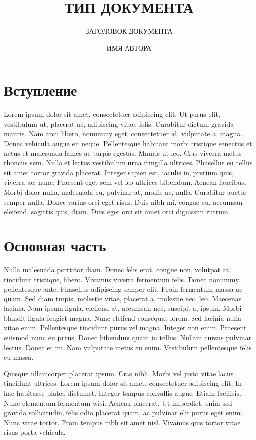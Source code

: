 \documentclass{itmo-report}
\title{ТИП ДОКУМЕНТА}
\subtitle{ЗАГОЛОВОК ДОКУМЕНТА}
\author{ИМЯ АВТОРА}
\begin{document}
\maketitle
\tableofcontents
\newpage


\section{Вступление}
Lorem ipsum dolor sit amet, consectetuer adipiscing elit. Ut purus elit, vestibulum ut, placerat ac, adipiscing vitae, felis. Curabitur dictum gravida mauris. Nam arcu libero, nonummy eget, consectetuer id, vulputate a, magna. Donec vehicula augue eu neque. Pellentesque habitant morbi tristique senectus et netus et malesuada fames ac turpis egestas. Mauris ut leo. Cras viverra metus rhoncus sem. Nulla et lectus vestibulum urna fringilla ultrices. Phasellus eu tellus sit amet tortor gravida placerat. Integer sapien est, iaculis in, pretium quis, viverra ac, nunc. Praesent eget sem vel leo ultrices bibendum. Aenean faucibus. Morbi dolor nulla, malesuada eu, pulvinar at, mollis ac, nulla. Curabitur auctor semper nulla. Donec varius orci eget risus. Duis nibh mi, congue eu, accumsan eleifend, sagittis quis, diam. Duis eget orci sit amet orci dignissim rutrum.
\newpage


\section{Основная часть}
Nulla malesuada porttitor diam. Donec felis erat, congue non, volutpat at, tincidunt tristique, libero. Vivamus viverra fermentum felis. Donec nonummy pellentesque ante. Phasellus adipiscing semper elit. Proin fermentum massa ac quam. Sed diam turpis, molestie vitae, placerat a, molestie nec, leo. Maecenas lacinia. Nam ipsum ligula, eleifend at, accumsan nec, suscipit a, ipsum. Morbi blandit ligula feugiat magna. Nunc eleifend consequat lorem. Sed lacinia nulla vitae enim. Pellentesque tincidunt purus vel magna. Integer non enim. Praesent euismod nunc eu purus. Donec bibendum quam in tellus. Nullam cursus pulvinar lectus. Donec et mi. Nam vulputate metus eu enim. Vestibulum pellentesque felis eu massa.

Quisque ullamcorper placerat ipsum. Cras nibh. Morbi vel justo vitae lacus tincidunt ultrices. Lorem ipsum dolor sit amet, consectetuer adipiscing elit. In hac habitasse platea dictumst. Integer tempus convallis augue. Etiam facilisis. Nunc elementum fermentum wisi. Aenean placerat. Ut imperdiet, enim sed gravida sollicitudin, felis odio placerat quam, ac pulvinar elit purus eget enim. Nunc vitae tortor. Proin tempus nibh sit amet nisl. Vivamus quis tortor vitae risus porta vehicula.
\end{document}
